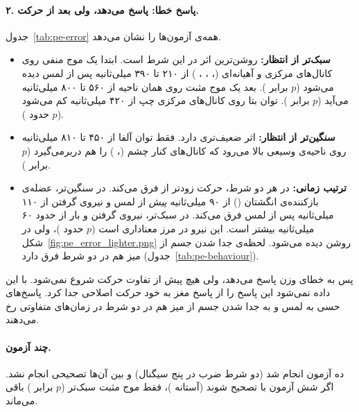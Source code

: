 \begin{table}[H]
\centering
\caption{رفتار: تفاوت بلند کردن پیش‌بینی‌نشده با بلند کردن مطابق انتظار هم‌وزن. ستون جهت مورد انتظار تعداد نفرهایی است که تفاوت‌شان در جهت پیش‌بینی ادبیات است؛ $p$ از آزمون  دوطرفه روی ۱۲ نفر.}
\label{tab:pe-behaviour}

\end{table}


\paragraph{۲. پاسخ خطا:  پاسخ می‌دهد، ولی بعد از حرکت.} جدول~\ref{tab:pe-error} همه‌ی آزمون‌ها را نشان می‌دهد.
\begin{itemize}
\item \textbf{سبک‌تر از انتظار:} روشن‌ترین اثر  در این شرط است. ابتدا یک موج منفی روی کانال‌های مرکزی و آهیانه‌ای (، ، ، ) از ۲۱۰ تا ۳۹۰ میلی‌ثانیه پس از لمس دیده می‌شود ($p$ برابر ). بعد یک موج مثبت روی همان ناحیه از ۵۶۰ تا ۸۰۰ میلی‌ثانیه می‌آید ($p$ برابر ). توان بتا روی کانال‌های مرکزی چپ از ۴۲۰ میلی‌ثانیه کم می‌شود ($p$ حدود ).
\item \textbf{سنگین‌تر از انتظار:}  اثر ضعیف‌تری دارد. فقط توان آلفا از ۴۵۰ تا ۸۱۰ میلی‌ثانیه روی ناحیه‌ی وسیعی بالا می‌رود که کانال‌های کنار چشم (، ) را هم دربرمی‌گیرد ($p$ برابر ).
\item \textbf{ترتیب زمانی:} در هر دو شرط، حرکت زودتر از  فرق می‌کند. در سنگین‌تر،  عضله‌ی بازکننده‌ی انگشتان () از ۹۰ میلی‌ثانیه \emph{پیش} از لمس و نیروی گرفتن از ۱۱۰ میلی‌ثانیه پس از لمس فرق می‌کند. در سبک‌تر، نیروی گرفتن و بار از حدود ۶۰ میلی‌ثانیه بیشتر است. این  نیرو در مرز معناداری است ($p$ حدود )، ولی در شکل~\ref{fig:pe_error_lighter.png} روشن دیده می‌شود. لحظه‌ی جدا شدن جسم از میز هم در دو شرط فرق دارد (جدول~\ref{tab:pe-behaviour}).
\end{itemize}

پس  به خطای وزن پاسخ می‌دهد، ولی هیچ   پیش از تفاوت حرکت شروع نمی‌شود. با این داده نمی‌شود این پاسخ را از پاسخ مغز به خود حرکت اصلاحی جدا کرد. پاسخ‌های حسی به لمس و به جدا شدن جسم از میز هم در دو شرط در زمان‌های متفاوتی رخ می‌دهند.

\paragraph{چند آزمون.} ده آزمون  انجام شد (دو شرط ضرب در پنج سیگنال) و بین آن‌ها تصحیحی انجام نشد. اگر شش آزمون  با  تصحیح شوند (آستانه )، فقط موج مثبت سبک‌تر ($p$ برابر ) باقی می‌ماند.

